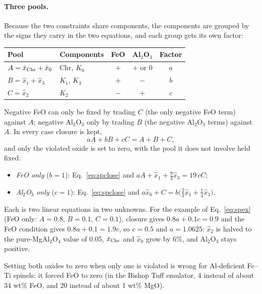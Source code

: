\documentclass[11pt]{article}
\begin{document}
\paragraph{Three pools.} Because the two constraints share components, the components are
grouped by the signs they carry in the two equations, and each group gets its own factor:
\begin{center}
\begin{tabular}{@{}l l c c c@{}}
\toprule
Pool & Components & FeO & Al$_2$O$_3$ & Factor \\
\midrule
$A = \hat x_{\rm Chr} + \hat x_0$ & Chr, $K_0$ & $+$ & $+$ or 0 & $a$ \\
$B = \hat x_1 + \hat x_3$         & $K_1$, $K_3$ & $+$ & $-$ & $b$ \\
$C = \hat x_2$                    & $K_2$ & $-$ & $+$ & $c$ \\
\bottomrule
\end{tabular}
\end{center}
Negative FeO can only be fixed by trading $C$ (the only negative FeO term) against $A$;
negative Al$_2$O$_3$ only by trading $B$ (the negative Al$_2$O$_3$ terms) against $A$. In
every case closure is kept,
\begin{equation}
  aA + bB + cC = A + B + C, \label{eq:spclose}
\end{equation}
and only the violated oxide is set to zero, with the pool it does not involve held fixed:
\begin{itemize}[nosep]
  \item \emph{FeO only} ($b = 1$): Eq.~\eqref{eq:spclose} and
        $aA + \hat x_1 + \tfrac94\hat x_3 = 19\,cC$;
  \item \emph{Al$_2$O$_3$ only} ($c = 1$): Eq.~\eqref{eq:spclose} and
        $a\hat x_0 + C = b\big(\tfrac23\hat x_1 + \tfrac14\hat x_3\big)$.
\end{itemize}
Each is two linear equations in two unknowns. For the example of Eq.~\eqref{eq:spex}
(FeO only: $A = 0.8$, $B = 0.1$, $C = 0.1$), closure gives $0.8a + 0.1c = 0.9$ and the FeO
condition gives $0.8a + 0.1 = 1.9c$, so $c = 0.5$ and $a = 1.0625$: $\hat x_2$ is halved to
the pure-MgAl$_2$O$_4$ value of 0.05, $\hat x_{\rm Chr}$ and $\hat x_0$ grow by 6\%, and
Al$_2$O$_3$ stays positive.

Setting both oxides to zero when only one is violated is wrong for Al-deficient Fe--Ti
spinels: it forced FeO to zero (in the Bishop Tuff emulator, 4 instead of about 34 wt\%
FeO, and 20 instead of about 1 wt\% MgO).
\end{document}
